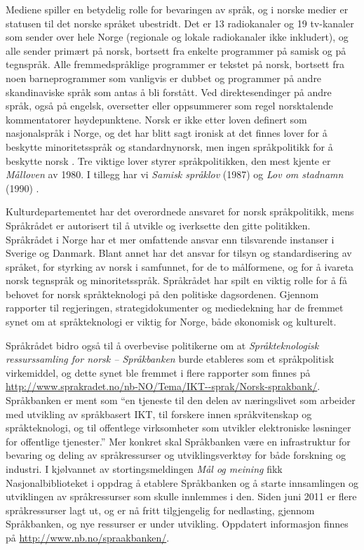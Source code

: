 \begin{multicols}{2}
Mediene spiller en betydelig rolle for bevaringen av språk, og i norske medier er statusen til det norske språket ubestridt. Det er 13 radiokanaler og 19 tv-kanaler som sender over hele Norge (regionale og lokale radiokanaler ikke inkludert), og alle sender primært på norsk, bortsett fra enkelte programmer på samisk og på tegnspråk. 
Alle fremmedspråklige programmer er tekstet på norsk, bortsett fra noen barneprogrammer som vanligvis er dubbet og programmer på andre skandinaviske språk som antas å bli forstått. 
Ved direktesendinger på andre språk, også på engelsk, oversetter eller oppsummerer som regel norsktalende kommentatorer høydepunktene. Norsk er ikke etter loven definert som nasjonalspråk i Norge, og det har blitt sagt ironisk at det finnes lover for å beskytte minoritetsspråk og standardnynorsk, men ingen språkpolitikk for å beskytte norsk \cite{nih:2005}. 
Tre viktige lover styrer språkpolitikken, den mest kjente er \textit{Målloven} av 1980. I tillegg har vi \textit{Samisk språklov} (1987) og \textit{Lov om stadnamn} (1990) \cite{stm35:2008}.

Kulturdepartementet har det overordnede ansvaret for norsk språkpolitikk, mens Språkrådet er autorisert til å utvikle og iverksette den gitte politikken. Språkrådet i Norge har et mer omfattende ansvar enn tilsvarende instanser i Sverige og Danmark. 
Blant annet har det ansvar for tilsyn og standardisering av språket, for styrking av norsk i samfunnet, for de to målformene, og for å ivareta norsk tegnspråk og minoritetsspråk. 
Språkrådet har spilt en viktig rolle for å få behovet for norsk språkteknologi på den politiske dagsordenen. 
Gjennom rapporter til regjeringen, strategidokumenter og mediedekning har de fremmet synet om at språkteknologi er viktig for Norge, både økonomisk og kulturelt.


Språkrådet bidro også til å overbevise politikerne om at \textit{Språkteknologisk ressurssamling for norsk -- Språkbanken} burde etableres som et språkpolitisk virkemiddel, og dette synet ble fremmet i flere rapporter som finnes på \url{http://www.sprakradet.no/nb-NO/Tema/IKT--sprak/Norsk-sprakbank/}.
Språkbanken er ment som ``en tjeneste til den delen av næringslivet som arbeider med utvikling av språkbasert IKT, til forskere innen språkvitenskap og språkteknologi, og til offentlege virksomheter som utvikler elektroniske løsninger for offentlige tjenester.''
Mer konkret skal Språkbanken være en infrastruktur for bevaring og deling av språkressurser og utviklingsverktøy for både forskning og industri.
I kjølvannet av stortingsmeldingen \textit{Mål og meining} \cite{stm35:2008} fikk Nasjonalbiblioteket i oppdrag å etablere Språkbanken og å starte innsamlingen og utviklingen av språkressurser som skulle innlemmes i den.
Siden juni 2011 er flere språkressurser lagt ut, og er nå fritt tilgjengelig for nedlasting, gjennom Språkbanken, og nye ressurser er under utvikling.
Oppdatert informasjon finnes på \url{http://www.nb.no/spraakbanken/}.


\end{multicols}
